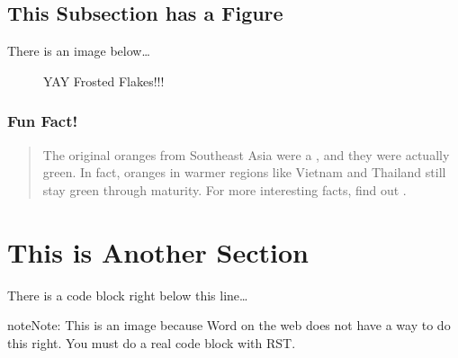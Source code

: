 \documentclass[letterpaper,10pt,english]{sphinxmanual}
\begin{document}
\section{This Subsection has a Figure}
\label{\detokenize{main:this-subsection-has-a-figure}}
There is an image below…


\begin{wrapfigure}{r}{0pt}
\centering
\noindent{}
\caption{YAY Frosted Flakes!!!}\label{\detokenize{main:id4}}\end{wrapfigure}


\subsection{Fun Fact!}
\label{\detokenize{main:fun-fact}}\begin{quote}

The original oranges from Southeast Asia were a , and they were actually green. In fact, oranges in warmer regions like Vietnam and Thailand still stay green through maturity. For more interesting facts, find out .
\end{quote}


\chapter{This is Another Section}
\label{\detokenize{main:this-is-another-section}}
There is a code block right below this line…

\begin{sphinxVerbatim}[commandchars=\\\{\},numbers=left,firstnumber=1,stepnumber=1]
 

 

   
\end{sphinxVerbatim}

\begin{sphinxadmonition}{note}{Note:}
This is an image because Word on the web does not have a way to do this right. You must do a real code block with RST.
\end{sphinxadmonition}
\end{document}
